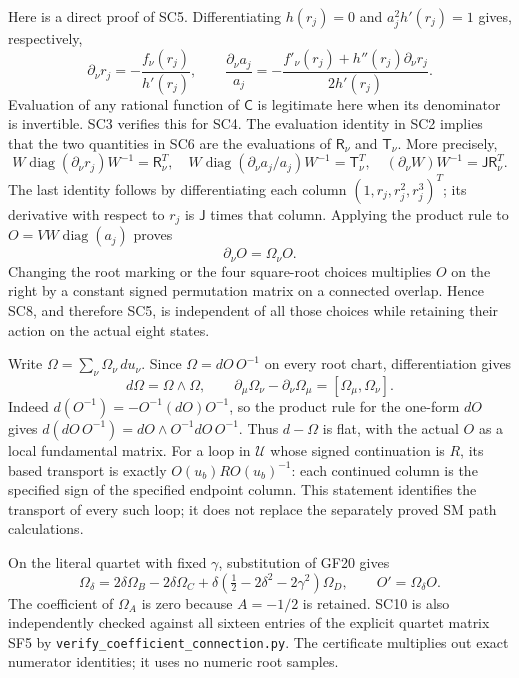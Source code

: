 \documentclass[11pt]{article}
\begin{document}
Here is a direct proof of SC5. Differentiating $h(r_j)=0$ and
$a_j^2h'(r_j)=1$ gives, respectively,
\[
 \partial_\nu r_j=-\frac{f_\nu(r_j)}{h'(r_j)},\qquad
 \frac{\partial_\nu a_j}{a_j}
 =-\frac{f'_\nu(r_j)+h''(r_j)\partial_\nu r_j}{2h'(r_j)}.
 \tag{SC6}
\]
Evaluation of any rational function of $\mathsf C$ is legitimate here
when its denominator is invertible. SC3 verifies this for SC4.
The evaluation identity in SC2 implies that the two quantities in SC6
are the evaluations of $\mathsf R_\nu$ and $\mathsf T_\nu$.
More precisely,
\[
 W\operatorname{diag}(\partial_\nu r_j)W^{-1}
       =\mathsf R_\nu^T,\quad
 W\operatorname{diag}(\partial_\nu a_j/a_j)W^{-1}
       =\mathsf T_\nu^T,\quad
 (\partial_\nu W)W^{-1}=\mathsf J\mathsf R_\nu^T.
 \tag{SC7}
\]
The last identity follows by differentiating each column
$(1,r_j,r_j^2,r_j^3)^T$; its derivative with respect to $r_j$ is
$\mathsf J$ times that column. Applying the product rule to
$O=VW\operatorname{diag}(a_j)$ proves
\[
 \partial_\nu O=\Omega_\nu O. \tag{SC8}
\]
Changing the root marking or the four square-root choices multiplies
$O$ on the right by a constant signed permutation matrix on a connected
overlap. Hence SC8, and therefore SC5, is independent of all those
choices while retaining their action on the actual eight states.

Write $\Omega=\sum_\nu\Omega_\nu\,du_\nu$.
Since $\Omega=dO\,O^{-1}$ on every root chart, differentiation gives
\[
 d\Omega=\Omega\wedge\Omega,\qquad
 \partial_\mu\Omega_\nu-\partial_\nu\Omega_\mu
          =[\Omega_\mu,\Omega_\nu]. \tag{SC9}
\]
Indeed $d(O^{-1})=-O^{-1}(dO)O^{-1}$, so the product rule for the
one-form $dO$ gives $d(dO\,O^{-1})=dO\wedge O^{-1}dO\,O^{-1}$.
Thus $d-\Omega$ is flat, with the actual $O$ as a local fundamental
matrix. For a loop in $\mathcal U$ whose signed continuation is $R$,
its based transport is exactly $O(u_b)R O(u_b)^{-1}$: each continued
column is the specified sign of the specified endpoint column. This
statement identifies the transport of every such loop; it does not
replace the separately proved SM path calculations.

On the literal quartet with fixed $\gamma$, substitution of GF20 gives
\[
 \Omega_\delta=2\delta\Omega_B-2\delta\Omega_C+
  \delta(\tfrac12-2\delta^2-2\gamma^2)\Omega_D,
 \qquad O'=\Omega_\delta O. \tag{SC10}
\]
The coefficient of $\Omega_A$ is zero because $A=-1/2$ is retained.
SC10 is also independently checked against all sixteen entries of the
explicit quartet matrix SF5 by
\texttt{verify\_coefficient\_connection.py}. The certificate multiplies
out exact numerator identities; it uses no numeric root samples.
\end{document}
